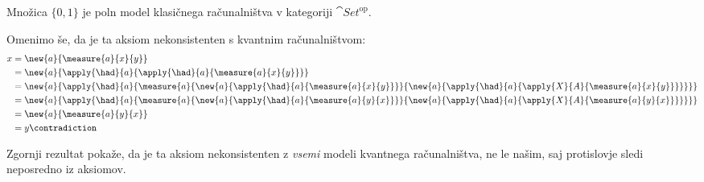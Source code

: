 \begin{proposition}
    Množica \(\{0,1\}\) je poln model klasičnega računalništva v kategoriji \(\cat{Set}^{\textrm{op}}\).
\end{proposition}

Omenimo še, da je ta aksiom nekonsistenten s kvantnim računalništvom:
\begin{align*}
    x &= \new{a}{\measure{a}{x}{y}}\\
      &= \new{a}{\apply{\had}{a}{\apply{\had}{a}{\measure{a}{x}{y}}}}\\
      &= \new{a}{\apply{\had}{a}{\measure{a}{
            \new{a}{\apply{\had}{a}{             \measure{a}{x}{y}}}}{
            \new{a}{\apply{\had}{a}{\apply{X}{A}{\measure{a}{x}{y}}}}
        }}}\\
      &= \new{a}{\apply{\had}{a}{\measure{a}{
            \new{a}{\apply{\had}{a}{             \measure{a}{y}{x}}}}{
            \new{a}{\apply{\had}{a}{\apply{X}{A}{\measure{a}{y}{x}}}}
        }}}\\
      &= \new{a}{\measure{a}{y}{x}}\\
      &= y \contradiction
\end{align*}
\begin{remark}
    Zgornji rezultat pokaže, da je ta aksiom nekonsistenten z \emph{vsemi} modeli kvantnega računalništva, ne le našim, saj protislovje sledi neposredno iz aksiomov.
\end{remark}

